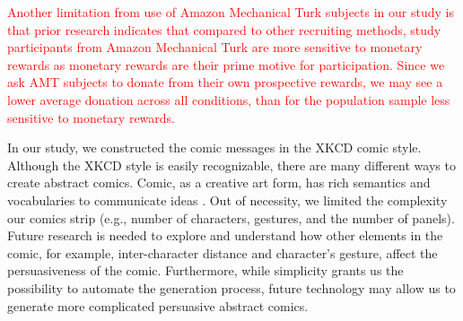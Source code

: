 \begin{description}[leftmargin=\parindent,topsep=0pt,partopsep=3pt,parsep=0pt,itemsep=3pt, listparindent=\parindent]
\textcolor{red}{Another limitation from use of Amazon Mechanical Turk subjects in our study is that prior research \cite{paolacci2010running,paolacci2014inside,kaufmann2011more} indicates that compared to other recruiting methods, study participants from Amazon Mechanical Turk are more sensitive to monetary rewards as monetary rewards are their prime motive for participation. 
Since we ask AMT subjects to donate from their own prospective rewards, we may see a lower average donation across all conditions, than for the population sample less sensitive to monetary rewards.
}     
  \item[Comic Message Construction:] In our study, we constructed the comic messages in the XKCD comic style. Although the XKCD style is easily recognizable, there are many different ways to create abstract comics.  Comic, as a creative art form, has rich semantics and vocabularies to communicate ideas \cite{scott1993understanding}. Out of necessity, we limited the complexity our comics strip (e.g., number of characters, gestures, and the number of panels). Future research is needed to explore and understand how other elements in the comic, for example, inter-character distance and character's gesture, affect the persuasiveness of the comic. Furthermore, while simplicity grants us the possibility to automate the generation process, future technology may allow us to generate more complicated persuasive abstract comics.
  
\end{description}

